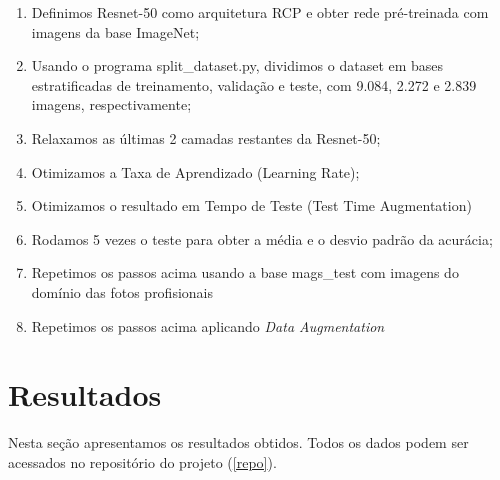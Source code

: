 \documentclass[conference]{IEEEtran}
\begin{document}
 \begin{enumerate}
  \item Definimos Resnet-50 como arquitetura RCP e obter rede pré-treinada com imagens da base ImageNet;
  \item Usando o programa split\_dataset.py, dividimos o dataset em bases estratificadas de treinamento, validação e teste, com 9.084, 2.272 e 2.839 imagens, respectivamente;
  \item Relaxamos as últimas 2 camadas restantes da Resnet-50;
  \item Otimizamos a Taxa de Aprendizado (Learning Rate);
  \item Otimizamos o resultado em Tempo de Teste (Test Time Augmentation)
  \item Rodamos 5 vezes o teste para obter a média e o desvio padrão da acurácia;
  \item Repetimos os passos acima usando a base mags\_test com imagens do domínio das fotos profisionais
  \item Repetimos os passos acima aplicando \textit{Data Augmentation} 
\end{enumerate}
\section{Resultados}
Nesta seção apresentamos os resultados obtidos. Todos os dados podem ser acessados no repositório do projeto (\ref{repo}).
\end{document}

